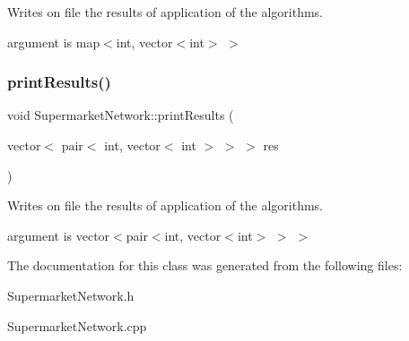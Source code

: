 Writes on file the results of application of the algorithms. 

argument is map$<$int, vector$<$int$>$ $>$ \hypertarget{class_supermarket_network_adb6dd660ec70427802da4e18f96d725d}{}\label{class_supermarket_network_adb6dd660ec70427802da4e18f96d725d} 
\subsubsection{\texorpdfstring{print\+Results()}{printResults()}\hspace{0.1cm}{\footnotesize\ttfamily [2/2]}}
{\footnotesize\ttfamily void Supermarket\+Network\+::print\+Results (\begin{DoxyParamCaption}\item[{vector$<$ pair$<$ int, vector$<$ int $>$ $>$ $>$}]{res }\end{DoxyParamCaption})}



Writes on file the results of application of the algorithms. 

argument is vector$<$pair$<$int, vector$<$int$>$ $>$ $>$ 

The documentation for this class was generated from the following files\+:\begin{DoxyCompactItemize}
\item 
Supermarket\+Network.\+h\item 
Supermarket\+Network.\+cpp\end{DoxyCompactItemize}
